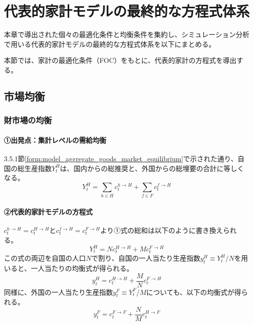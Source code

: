 
\section{代表的家計モデルの最終的な方程式体系}
\label{sec:chapter3_final_equations}
本章で導出された個々の最適化条件と均衡条件を集約し、シミュレーション分析で用いる代表的家計モデルの最終的な方程式体系を以下にまとめる。

本節では、家計の最適化条件（FOC）をもとに、代表的家計の方程式を導出する。

\subsection{市場均衡}
\label{sec:chapter3_final_equations_market}
\subsubsection{財市場の均衡}
\label{sec:chapter3_final_equations_market_goods}
\paragraph{①出発点：集計レベルの需給均衡}\label{sec:chapter3_final_equations_market_goods_agg_origin}
3.5.1節\eqref{form:model_aggregate_goods_market_equilibrium}で示された通り、自国の総生産指数\(Y_t^H\)は、国内からの総推奨と、外国からの総埋要の合計に等しくなる。
\begin{equation}
Y_t^H=\sum_{h\in H}c_t^{h\to H}+\sum_{f\in F}c_t^{f\to H}
\label{form:model_final_equations_market_goods_agg_restated}
\end{equation}

\paragraph{②代表的家計モデルの方程式}\label{sec:chapter3_final_equations_market_goods_ra_eq}
\(c_t^{h\to H}=c_t^{H\to H}\)と\(c_t^{f\to H}=c_t^{F\to H}\)より①式の総和は以下のように書き換えられる。
\begin{equation}
Y_t^H=Nc_t^{H\to H}+Mc_t^{F\to H}
\label{form:model_final_equations_market_goods_agg_sum}
\end{equation}
この式の両辺を自国の人口\(N\)で割り、自国の一人当たり生産指数\(y_t^H\equiv Y_t^H/N\)を用いると、一人当たりの均衡式が得られる。
\begin{equation}
y_t^H=c_t^{H\to H}+\frac{M}{N}c_t^{F\to H}
\label{form:model_final_equations_market_goods_eq_h}
\end{equation}
同様に、外国の一人当たり生産指数\(y_t^F\equiv Y_t^F/M\)についても、以下の均衡式が得られる。
\begin{equation}
y_t^F=c_t^{F\to F}+\frac{N}{M}c_t^{H\to F}
\label{form:model_final_equations_market_goods_eq_f}
\end{equation}

